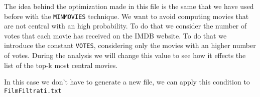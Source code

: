 \nd The idea behind the optimization made in this file is the same that we have used before with the \texttt{MINMOVIES} technique. We want to avoid computing movies that are not central with an high probability. To do that we consider the number of votes that each movie has received on the IMDB website. To do that we introduce the constant \texttt{VOTES}, considering only the movies with an higher number of votes. During the analysis we will change this value to see how it effects the list of the top-k most central movies. \s

\nd In this case we don't have to generate a new file, we can apply this condition to \texttt{FilmFiltrati.txt}
